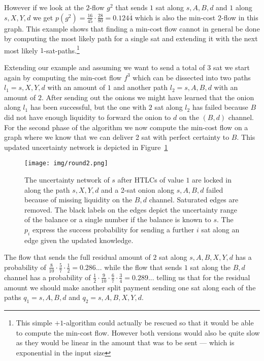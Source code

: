 \documentclass[10pt,twocolumn]{article}
\begin{document}
However if we look at the $2$-flow $g^2$ that sends $1$ sat along $s,A,B,d$ and $1$ along $s,X,Y,d$ we get $p(g^2)=\frac{16}{45}\cdot\frac{28}{80} = 0.124\overline{4}$
which is also the min-cost $2$-flow in this graph.
This example shows that finding a min-cost flow cannot in general be done  by computing the most likely path for a single sat and extending it with the next most likely $1$-sat-paths.\footnote{This simple $+1$-algorithm could actually be rescued so that it would be able to compute the min-cost flow. However both versions would also be quite slow as they would be linear in the amount that was to be sent --- which is exponential in the input size}

Extending our example and assuming we want to send a total of 3 sat we start again by computing the min-cost flow $f^3$ which can be dissected into two paths $l_1= s,X,Y,d$ with an amount of $1$ and another path $l_2=s,A,B,d$ with an amount of $2$.
After sending out the onions we might have learned that the onion along $l_1$ has been successful, but the one with $2$ sat along $l_2$ has failed because $B$ did not have enough liquidity to forward the onion to $d$ on the $(B,d)$ channel.
For the second phase of the algorithm we now compute the min-cost flow on a graph where we know that we can deliver 2 sat with perfect certainty to $B$.
This updated uncertainty network is depicted in Figure~\ref{fig:round2}
\begin{figure}[htpb]
  \center
  \texttt{[image: img/round2.png]}
\caption{The uncertainty network of $s$ after HTLCs of value $1$ are locked in along the path $s,X,Y,d$ and a 2-sat onion along $s,A,B,d$ failed because of missing liquidity on the $B,d$ channel. Saturated edges are removed. The black labels on the edges depict the uncertainty range of the balance or a single number if the balance is known to $s$. The $p_i$ express the success probability for sending a further $i$ sat along an edge given the updated knowledge. }

  \label{fig:round2}
\end{figure}

The flow that sends the full residual amount of $2$ sat along $s,A,B,X,Y,d$ has a probability of $\frac{8}{10}\cdot\frac{5}{7}\cdot\frac{1}{2}=0.286...$ while the flow that sends $1$ sat along the $B,d$ channel has a probability of $\frac{1}{2}\cdot\frac{9}{10}\cdot\frac{6}{7}\cdot\frac{3}{4}=0.289...$ telling us that for the residual amount we should make another split payment sending one sat along each of the paths $q_1=s,A,B,d$ and $q_2=s,A,B,X,Y,d$.
\end{document}

